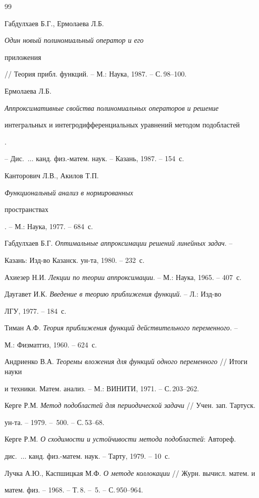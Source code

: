 \begin{thebibliography}{99}







Габдулхаев Б.Г., Ермолаева Л.Б. {\em Один новый полиномиальный оператор и его


приложения} // Теория прибл. функций. -- М.: Наука, 1987. -- С.\,98--100.




Ермолаева Л.Б. {\em Аппроксимативные свойства полиномиальных операторов и решение


интегральных и интегродифференциальных уравнений методом подобластей}.


-- Дис.~$\dotsc$ канд. физ.-матем. наук. -- Казань, 1987. -- 154~с.




Канторович Л.В., Акилов Т.П. {\em Функциональный анализ в нормированных


пространствах}. -- М.: Наука, 1977. -- 684~с.




Габдулхаев Б.Г. {\em Оптимальные аппроксимации решений линейных задач}. --


Казань: Изд-во Казанск. ун-та, 1980. -- 232~с.




Ахиезер Н.И. {\em Лекции по теории аппроксимации}. -- М.: Наука, 1965. -- 407~с.




Даугавет И.К. {\em Введение в теорию приближения функций}. -- Л.: Изд-во


ЛГУ, 1977. -- 184~с.




Тиман А.Ф. {\em Теория приближения функций действительного переменного}. --


М.: Физматгиз, 1960. -- 624~с.




Андриенко В.А. {\em Теоремы вложения для функций одного переменного} // Итоги науки


и техники. Матем. анализ. -- М.: ВИНИТИ, 1971. -- С.\,203--262.




Керге Р.М. {\em Метод подобластей для периодической задачи} // Учен. зап. Тартуск.


ун-та. -- 1979. -- \No\,500. -- С.\,53--68.




Керге Р.М. {\em О сходимости и устойчивости метода подобластей}: Автореф.


дис.~$\dotsc$ канд. физ.-матем. наук. -- Тарту, 1979. -- 10~с.




Лучка А.Ю., Каспшицкая М.Ф. {\em О методе коллокации} // Журн. вычисл. матем. и


матем. физ. -- 1968. -- Т.\,8. -- \No\,5. -- С.\,950--964.





\end{thebibliography}
